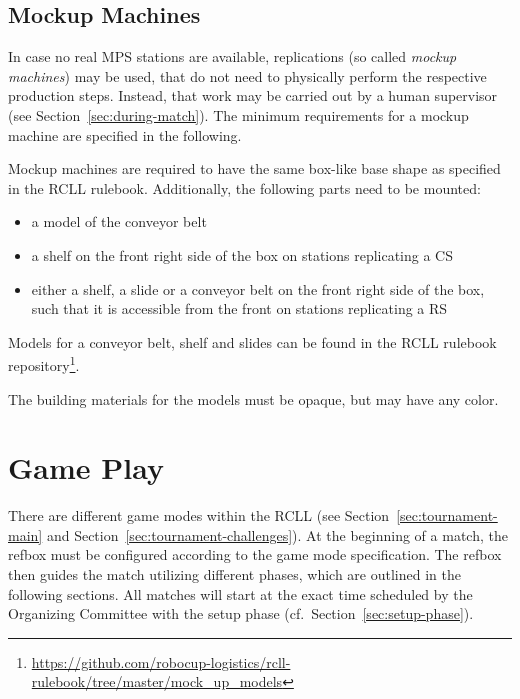 \documentclass[12pt,twoside]{article}
\newcommand{\refsec}[1]{Section~\ref{#1}}
\begin{document}
\subsection{Mockup Machines}
\label{sec:mockup-machines}
In case no real MPS stations are available, replications
(so called \emph{mockup machines}) may be used, that do not need to
physically perform the respective production steps. Instead, that work may
be carried out by a human supervisor (see \refsec{sec:during-match}).
The minimum requirements for a mockup machine are specified in the following.

Mockup machines are required to have the same box-like base shape as specified
in the RCLL rulebook.
Additionally, the following parts need to be mounted:
\begin{itemize}
	\item a model of the conveyor belt
	\item a shelf on the front right side of the box on stations replicating a
		CS
	\item either a shelf, a slide or a conveyor belt on the front right side
of the box, such that it is accessible from the front on stations replicating a
		RS
\end{itemize}
Models for a conveyor belt, shelf and slides can be found in the RCLL rulebook
repository\footnote{\url{https://github.com/robocup-logistics/rcll-rulebook/tree/master/mock_up_models}}. %

The building materials for the models must be opaque, but may have any color.

\section{Game Play}
There are different game modes within the RCLL (see \refsec{sec:tournament-main}
and \refsec{sec:tournament-challenges}).
At the beginning of a match, the refbox must be configured according to the
game mode specification.
The refbox then guides the match utilizing different phases, which are outlined
in the following sections.
All matches will start at the exact time scheduled by the Organizing
Committee with the setup phase (cf.~\refsec{sec:setup-phase}).
\end{document}
